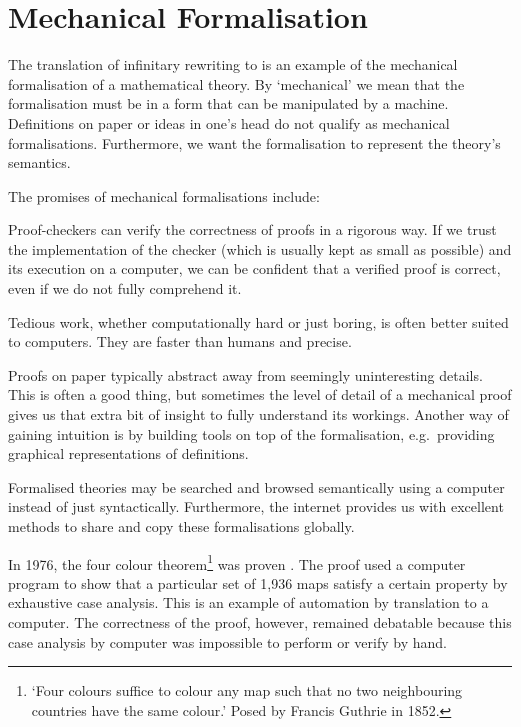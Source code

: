\section*{Mechanical Formalisation}

The translation of infinitary rewriting to \Coq is an example of the
mechanical formalisation of a mathematical theory. By `mechanical' we
mean that the formalisation must be in a form that can be manipulated
by a machine. Definitions on paper or ideas in one's head do not
qualify as mechanical formalisations. Furthermore, we want the
formalisation to represent the theory's semantics.

The promises of mechanical formalisations include:
\begin{compactdesc}
  \item[\normalfont{\emph{Confidence}}\hskip .5em]
    Proof-checkers can verify the correctness of proofs in a rigorous
    way. If we trust the implementation of the checker (which is
    usually kept as small as possible) and its execution on a
    computer, we can be confident that a verified proof is correct,
    even if we do not fully comprehend it.
  \item[\normalfont{\emph{Automation}}\hskip .5em]
    Tedious work, whether computationally hard or just boring, is
    often better suited to computers. They are faster than humans and
    precise.
  \item[\normalfont{\emph{Intuition}}\hskip .5em]
    Proofs on paper typically abstract away from seemingly
    uninteresting  details. This is often a good thing, but sometimes
    the level of detail of a mechanical proof gives us that extra bit
    of insight to fully understand its workings. Another way of
    gaining intuition is by building tools on top of the
    formalisation, e.g.\ providing graphical representations of
    definitions.
  \item[\normalfont{\emph{Availability}}\hskip .5em]
    Formalised theories may be searched and browsed semantically using
    a computer instead of just syntactically. Furthermore, the
    internet provides us with excellent methods to share and copy
    these formalisations globally.
\end{compactdesc}

In 1976, the four colour theorem\footnote{`Four colours suffice to
  colour any map such that no two neighbouring countries have the same
  colour.' Posed by Francis Guthrie in 1852. } was proven
\citep{appel-haken-76}. The proof used a computer program to show that
a particular set of 1,936 maps satisfy a certain property by
exhaustive case analysis. This is an
example of automation by translation to a computer. The correctness of
the proof, however, remained debatable because this case analysis by
computer was impossible to perform or verify by hand.

